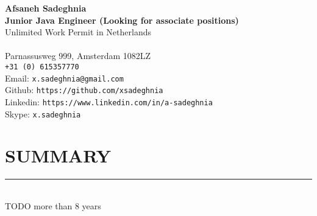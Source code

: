 \documentclass[10pt,a4paper]{article}
\begin{document}
\noindent \textbf{Afsaneh Sadeghnia} \\
\noindent \small \textbf{Junior Java Engineer (Looking for associate positions)} \\
\noindent \small Unlimited Work Permit in Netherlands \\ \\
Parnassusweg 999, Amsterdam 1082LZ \\
\texttt{+31 (0) 615357770} \\
Email: \texttt{x.sadeghnia@gmail.com} \\
Github: \texttt{https://github.com/xsadeghnia} \\
Linkedin: \texttt{https://www.linkedin.com/in/a-sadeghnia} \\
Skype: \texttt{x.sadeghnia}

\section{SUMMARY}
\noindent \rule {18.0cm}{0.2pt} \\
\small TODO more than 8 years

\small
\end{document}

